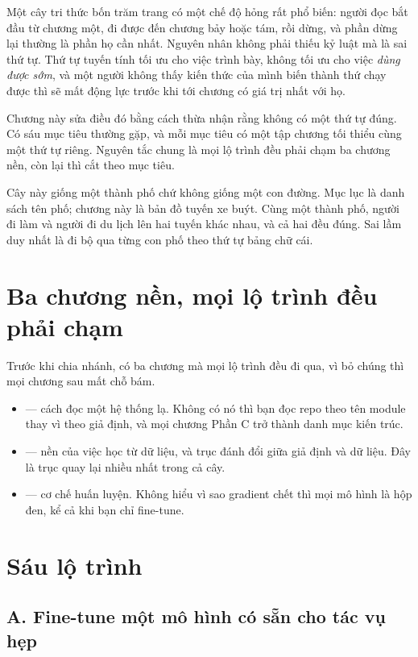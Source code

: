 \documentclass[../../deep_learning.tex]{subfiles}
\begin{document}
Một cây tri thức bốn trăm trang có một chế độ hỏng rất phổ biến: người đọc bắt đầu từ chương một, đi được đến chương bảy hoặc tám, rồi dừng, và phần dừng lại thường là phần họ cần nhất. Nguyên nhân không phải thiếu kỷ luật mà là sai thứ tự. Thứ tự tuyến tính tối ưu cho việc trình bày, không tối ưu cho việc \emph{dùng được sớm}, và một người không thấy kiến thức của mình biến thành thứ chạy được thì sẽ mất động lực trước khi tới chương có giá trị nhất với họ.

Chương này sửa điều đó bằng cách thừa nhận rằng không có một thứ tự đúng. Có sáu mục tiêu thường gặp, và mỗi mục tiêu có một tập chương tối thiểu cùng một thứ tự riêng. Nguyên tắc chung là mọi lộ trình đều phải chạm ba chương nền, còn lại thì cắt theo mục tiêu.

\begin{trucgiac}
Cây này giống một thành phố chứ không giống một con đường. Mục lục là danh sách tên phố; chương này là bản đồ tuyến xe buýt. Cùng một thành phố, người đi làm và người đi du lịch lên hai tuyến khác nhau, và cả hai đều đúng. Sai lầm duy nhất là đi bộ qua từng con phố theo thứ tự bảng chữ cái.
\end{trucgiac}

\section{Ba chương nền, mọi lộ trình đều phải chạm}

Trước khi chia nhánh, có ba chương mà mọi lộ trình đều đi qua, vì bỏ chúng thì mọi chương sau mất chỗ bám.

\begin{itemize}
\item {} --- cách đọc một hệ thống lạ. Không có nó thì bạn đọc repo theo tên module thay vì theo giả định, và mọi chương Phần C trở thành danh mục kiến trúc.
\item {} --- nền của việc học từ dữ liệu, và trục đánh đổi giữa giả định và dữ liệu. Đây là trục quay lại nhiều nhất trong cả cây.
\item {} --- cơ chế huấn luyện. Không hiểu vì sao gradient chết thì mọi mô hình là hộp đen, kể cả khi bạn chỉ fine-tune.
\end{itemize}

\section{Sáu lộ trình}

\subsection{A. Fine-tune một mô hình có sẵn cho tác vụ hẹp}
\end{document}
